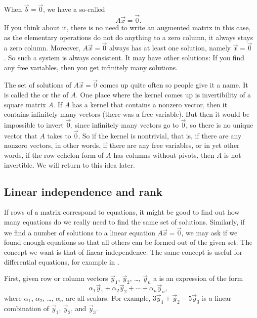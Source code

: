 \medskip

When $\vec{b} = \vec{0}$, we have a so-called
\emph{}
\begin{equation*}
A \vec{x} = \vec{0} .
\end{equation*}
If you think about it, there is no need to write an augmented matrix in this
case, as the elementary operations do not do anything to a zero column, it
always stays a zero column.  Moreover, $A \vec{x} = \vec{0}$ always has at
least one solution, namely $\vec{x} = \vec{0}$.  So such a system
is always consistent.  It may have other solutions:  If you find
any free variables, then you get infinitely many solutions.

The set of solutions of $A \vec{x} = \vec{0}$ comes up quite often
so people give it a name.  It is called the
\emph{} or the 
\emph{} of $A$.
One place where the kernel comes up is invertibility of a square matrix $A$.
If $A$ has a kernel that contains a nonzero vector, then it contains
infinitely many vectors (there was a free variable).  But then it would be
impossible to invert $\vec{0}$, since infinitely many vectors go to
$\vec{0}$, so there is no unique vector that $A$ takes to $\vec{0}$.
So if the kernel is nontrivial, that is, if there are any nonzero vectors,
in other words, if there are any free variables, or in yet other words,
if the row echelon form of $A$ has columns without pivots,
then $A$ is not invertible.  We will return to this idea later.

\subsection{Linear independence and rank}

If rows of a matrix correspond to equations, it might be good to find out
how many equations do we really need to find the same set of solutions.
Similarly, if we find a number of solutions to a linear equation
$A \vec{x} = \vec{0}$, we may ask if we found enough equations
so that all others can be formed out of the given set.
The concept we want is that of linear independence.
The same concept is useful for differential equations, for
example in .

First, given row or column vectors $\vec{y}_1$, $\vec{y}_2$, \ldots,
$\vec{y}_n$ a \emph{} is an expression of the form
\begin{equation*}
\alpha_1 \vec{y}_1 + 
\alpha_2 \vec{y}_2 + 
\cdots +
\alpha_n \vec{y}_n ,
\end{equation*}
where $\alpha_1$, $\alpha_2$, \ldots, $\alpha_n$ are all scalars.
For example,
$3 \vec{y}_1 + \vec{y}_2 - 5 \vec{y}_3$ is a linear combination
of $\vec{y}_1$, $\vec{y}_2$, and $\vec{y}_3$.

